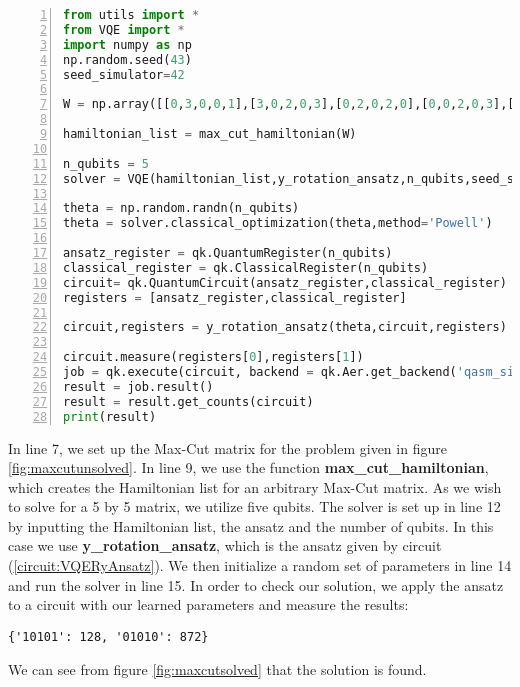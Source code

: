 \begin{lstlisting}[language=Python,numbers=left]
from utils import *
from VQE import *
import numpy as np
np.random.seed(43)
seed_simulator=42

W = np.array([[0,3,0,0,1],[3,0,2,0,3],[0,2,0,2,0],[0,0,2,0,3],[1,3,0,3,0]])

hamiltonian_list = max_cut_hamiltonian(W)

n_qubits = 5
solver = VQE(hamiltonian_list,y_rotation_ansatz,n_qubits,seed_simulator=seed_simulator)

theta = np.random.randn(n_qubits)
theta = solver.classical_optimization(theta,method='Powell')

ansatz_register = qk.QuantumRegister(n_qubits)
classical_register = qk.ClassicalRegister(n_qubits)
circuit= qk.QuantumCircuit(ansatz_register,classical_register)
registers = [ansatz_register,classical_register]

circuit,registers = y_rotation_ansatz(theta,circuit,registers)

circuit.measure(registers[0],registers[1])
job = qk.execute(circuit, backend = qk.Aer.get_backend('qasm_simulator'), shots=1000)
result = job.result()
result = result.get_counts(circuit)
print(result)
\end{lstlisting}
In line 7, we set up the Max-Cut matrix for the problem given in figure \ref{fig:maxcutunsolved}. In line 9, we use the function \textbf{max\_cut\_hamiltonian}, which creates the Hamiltonian list for an arbitrary Max-Cut matrix. As we wish to solve for a 5 by 5 matrix, we utilize five qubits. The solver is set up in line 12 by inputting the Hamiltonian list, the ansatz and the number of qubits. In this case we use \textbf{y\_rotation\_ansatz}, which is the ansatz given by circuit (\ref{circuit:VQERyAnsatz}). We then initialize a random set of parameters in line 14 and run the solver in line 15. In order to check our solution, we apply the ansatz to a circuit with our learned parameters and measure the results:
\begin{verbatim}
{'10101': 128, '01010': 872}
\end{verbatim}
We can see from figure \ref{fig:maxcutsolved} that the solution is found.


